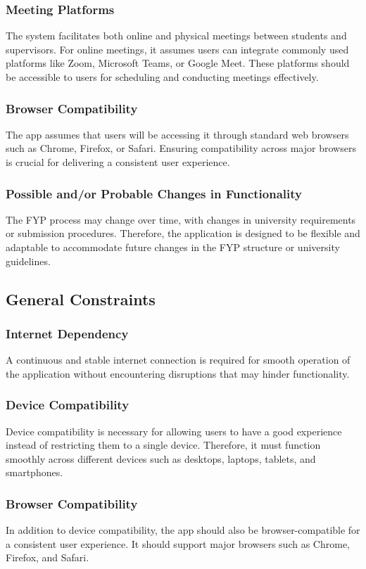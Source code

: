 \documentclass{FastFyp}
\begin{document}
\subsubsection{Meeting Platforms}
The system facilitates both online and physical meetings between students and supervisors. For online meetings, it assumes users can integrate commonly used platforms like Zoom, Microsoft Teams, or Google Meet. These platforms should be accessible to users for scheduling and conducting meetings effectively.

\subsubsection{Browser Compatibility}
The app assumes that users will be accessing it through standard web browsers such as Chrome, Firefox, or Safari. Ensuring compatibility across major browsers is crucial for delivering a consistent user experience.

\subsubsection{Possible and/or Probable Changes in Functionality}
The FYP process may change over time, with changes in university requirements or submission procedures. Therefore, the application is designed to be flexible and adaptable to accommodate future changes in the FYP structure or university guidelines.

\subsection{General Constraints}
\subsubsection{Internet Dependency}
A continuous and stable internet connection is required for smooth operation of the application without encountering disruptions that may hinder functionality.

\subsubsection{Device Compatibility}
Device compatibility is necessary for allowing users to have a good experience instead of restricting them to a single device. Therefore, it must function smoothly across different devices such as desktops, laptops, tablets, and smartphones.

\subsubsection{Browser Compatibility}
In addition to device compatibility, the app should also be browser-compatible for a consistent user experience. It should support major browsers such as Chrome, Firefox, and Safari.
\end{document}
